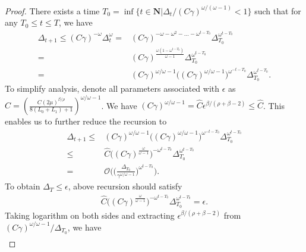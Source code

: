 \documentclass[10pt]{article} %
\newtheorem{proof}{Proof}
\begin{document}
\begin{proof}
    There exists a time $T_0= \inf \{ t \in \mathbf{N}| \Delta_{t}/{(C\gamma)}^{\omega/(\omega-1)}< 1\}$ such that for any $T_0\leq t\leq T$, we have
    \begin{align}
        \Delta_{t+1}\leq (C\gamma)^{-\omega}\Delta_t^{\omega}=&(C\gamma)^{-\omega-\omega^2-...-\omega^{t-T_0}}\Delta_{T_0}^{\omega^{t-T_0}}\nonumber\\
        =& (C\gamma)^{\frac{\omega(1-\omega^{t-T_0})}{\omega-1}} \Delta_{T_0}^{\omega^{t-T_0}}\nonumber\\
        =& (C\gamma)^{{\omega}/{\omega-1}}\big((C\gamma)^{{\omega}/{\omega-1}}\big)^{\omega^{-{t-T_0}}}\Delta_{T_0}^{\omega^{t-T_0}}.
    \end{align}
    To simplify analysis, denote all parameters associated with $\epsilon$ as $\hat{C}=(\frac{C(2\mu)^{{\beta}/{\rho}}}{8(L_0+L_1)+1})^{{\omega}/{\omega-1}}$. We have $(C\gamma)^{{\omega}/{\omega-1}} = \hat{C} \epsilon^{\beta/{(\rho+\beta-2)}}\leq \hat{C}$. 
    This enables us to further reduce the recursion to
    \begin{align}
        \Delta_{t+1}\leq&(C\gamma)^{{\omega}/{\omega-1}}\big((C\gamma)^{{\omega}/{\omega-1}}\big)^{\omega^{-{t-T_0}}}\Delta_{T_0}^{\omega^{t-T_0}} \nonumber\\
        \leq& \hat{C} \Big((C\gamma)^{\frac{\omega}{\omega-1}}\Big)^{{-\omega}^{t-T_0}}\Delta_{T_0}^{{\omega}^{t-T_0}} \nonumber\\
        =& \mathcal{O}\bigg(\Big(\frac{\Delta_{T_0}}{\gamma^{\omega/{\omega-1}}}\Big)^{\omega^{t-T_0}}\bigg).
    \label{descentPL3}
    \end{align} 
    To obtain $\Delta_T\leq \epsilon$,
    above recursion should satisfy
    \begin{align}
        \hat{C} \Big((C\gamma)^{\frac{\omega}{\omega-1}}\Big)^{{-\omega}^{t-T_0}}\Delta_{T_0}^{{\omega}^{t-T_0}}=\epsilon. \nonumber
    \end{align}
    Taking logarithm on both sides and extracting $\epsilon^{\beta/(\rho+\beta-2)}$ from ${(C\gamma)^{{\omega}/{\omega-1}}}/{\Delta_{T_0}}$, we have
    \begin{align}

\end{align}
\end{proof}
\end{document}
